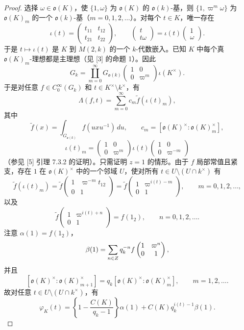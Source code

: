 \begin{proof}
选择 $\omega\in\mathfrak o(K)$，使 $\{1,\omega\}$ 为 $\mathfrak o(K)$ 的 $\mathfrak o(k)$-基，则 $\{1,\varpi^m\omega\}$ 为 $\mathfrak o(K)_m$ 的一个 $\mathfrak o(k)$-基（$m=0,1,2,\ldots$）。对每个 $t\in K$，唯一存在
\[
 \iota(t)=\begin{pmatrix}t_{11}&t_{12}\\t_{21}&t_{22}\end{pmatrix},
 \qquad\begin{pmatrix}t\\t\omega\end{pmatrix}
 =\iota(t)\begin{pmatrix}1\\\omega\end{pmatrix}.
\]
于是 $t\mapsto\iota(t)$ 是 $K$ 到 $M(2,k)$ 的一个 $k$-代数嵌入。已知 $K$ 中每个真 $\mathfrak o(K)_m$-理想都是主理想（见 [3] 的命题 1）。因此
\[
 G_k=\coprod_{m=0}^\infty G_{\mathfrak o(k)}
 \begin{pmatrix}1&0\\0&\varpi^m\end{pmatrix}\iota(K^\times).
\]
于是对任意 $f\in C_0^\infty(G_k)$ 和 $t\in K^\times\setminus k^\times$，有
\begin{equation}
 \Lambda(f,t)=\sum_{m=0}^\infty c_m\widetilde f(\iota(t)_m),
 \tag{2.3}
\end{equation}
其中
\[
 \widetilde f(x)=\int_{G_{\mathfrak o(k)}}f(uxu^{-1})\,du,
 \qquad c_m=[\mathfrak o(K)^\times:\mathfrak o(K)_m^\times],
\]
\[
 \iota(t)_m=\begin{pmatrix}1&0\\0&\varpi^m\end{pmatrix}
 \iota(t)\begin{pmatrix}1&0\\0&\varpi^{-m}\end{pmatrix}
\]
（参见 [5] 引理 7.3.2 的证明）。只需证明 $z=1$ 的情形。由于 $f$ 局部常值且紧支，存在 $1$ 在 $\mathfrak o(K)^\times$ 中的一个邻域 $U$，使对所有 $t\in U\setminus(U\cap k^\times)$ 有
\[
 \widetilde f(\iota(t)_m)
 =\widetilde f\begin{pmatrix}1&\varpi^{-m}t_{12}\\0&1\end{pmatrix}
 =\widetilde f\begin{pmatrix}1&\varpi^{i(t)-m}\\0&1\end{pmatrix},
 \qquad m=0,1,2,\ldots,
\]
以及
\[
 \widetilde f\begin{pmatrix}1&\varpi^{i(t)+n}\\0&1\end{pmatrix}
 =f(1_2),\qquad n=0,1,2,\ldots.
\]
注意 $\alpha(1)=f(1_2)$，
\[
 \beta(1)=\sum_{n\in Z}q_k^{-n}
 f\begin{pmatrix}1&\varpi^n\\0&1\end{pmatrix},
\]
并且
\[
 [\mathfrak o(K)^\times:\mathfrak o(K)_{m+1}^\times]
 =q_k[\mathfrak o(K)^\times:\mathfrak o(K)_m^\times],
 \qquad m=1,2,\ldots.
\]
故对任意 $t\in U\setminus(U\cap k^\times)$，有
\[
 \varphi_K(t)=\left\{1-\frac{C(K)}{q_k-1}\right\}\alpha(1)
 +C(K)q_k^{i(t)-1}\beta(1).
\]
\end{proof}

